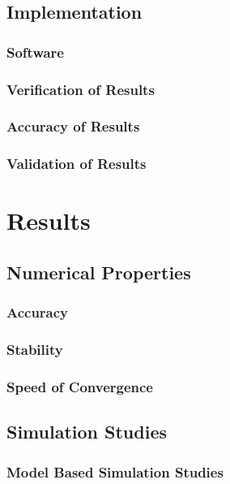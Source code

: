 \chapter{Implementation}\label{part:implementation}
\section{Software}
\section{Verification of Results}
\section{Accuracy of Results}
\section{Validation of Results}



\part{Results}\label{part:results}

\chapter{Numerical Properties}
\section{Accuracy}
\section{Stability}
\section{Speed of Convergence}

\chapter{Simulation Studies}
\section{Model Based Simulation Studies}



